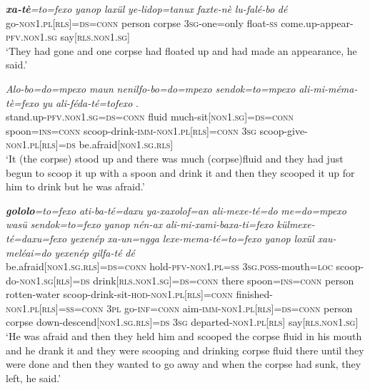 \documentclass[output=paper]{LSP/langsci}
\begin{document}
\begin{exe}
\ex \label{Devex:App4}			
\gll \textit{\textbf{xa-tè}=to=fexo} \textit{yanop} \textit{laxül}	\textit{ye-lidop=tanux} \textit{faxte-nè} \textit{lu-falé-bo} \textit{dé}\\
go-\textsc{non1.pl[rls]=ds=conn}	person corpse \textsc{3sg}-one=only float-\textsc{ss}	come.up-appear-\textsc{pfv.non1.sg} say[\textsc{rls.non1.sg}]\\
\glt `They had gone and one corpse had floated up and had made an appearance, he said.'
\end{exe}			
			
\begin{exe}
\ex \label{Devex:App5}			
\gll \textit{Alo-bo=do=mpexo} \textit{maun} \textit{nenilfo-bo=do=mpexo} \textit{sendok=to=mpexo} \textit{ali-mi-méma-tè=fexo} \textit{yu} \textit{ali-féda-té=tofexo} \underline{\textit{}}.\\
stand.up-\textsc{pfv.non1.sg=ds=conn} fluid much-sit[\textsc{non1.sg}]=\textsc{ds=conn} spoon=\textsc{ins=conn}	scoop-drink-\textsc{imm-non1.pl[rls]=conn} \textsc{3sg} scoop-give-\textsc{non1.pl[rls]=ds} be.afraid[\textsc{non1.sg.rls}]\\
\glt `It (the corpse) stood up and there was much (corpse)fluid and they had just begun to scoop it up with a spoon and drink it and then they scooped it up for him to drink but he was afraid.'\\
\end{exe}			
	
\begin{exe}
\ex \label{Devex:App6}			
\gll \textit{\textbf{gololo}=to=fexo}	\textit{ati-ba-té=daxu}	\textit{ya-xaxolof=an} \textit{ali-mexe-té=do} \textit{me=do=mpexo} \textit{wasü} \textit{sendok=to=fexo} \textit{yanop} \textit{nén-ax} \textit{ali-mi-xami-baxa-ti=fexo} \textit{külmexe-té=daxu=fexo} \textit{yexenép} \textit{xa-un=ngga} \textit{lexe-mema-té=to=fexo} \textit{yanop} \textit{loxül} \textit{xau-meléai=do} \textit{yexenép} \textit{gilfa-té} \textit{dé}\\
be.afraid[\textsc{non1.sg.rls}]=\textsc{ds=conn} hold-\textsc{pfv-non1.pl=ss} \textsc{3sg.poss}-mouth=\textsc{loc} scoop-do-\textsc{non1.sg[rls]=ds} drink[\textsc{rls.non1.sg}]=\textsc{ds=conn} there spoon=\textsc{ins=conn}	person rotten-water scoop-drink-sit-\textsc{hod-non1.pl[rls]=conn} finished-\textsc{non1.pl[rls]=ss=conn} \textsc{3pl}	go-\textsc{inf=conn}	aim-\textsc{imm-non1.pl[rls]=ds=conn} person	corpse down-descend[\textsc{non1.sg.rls}]=\textsc{ds} \textsc{3sg} departed-\textsc{non1.pl[rls]} say[\textsc{rls.non1.sg}]\\
\glt `He was afraid and then they held him and scooped the corpse fluid in his mouth and he drank it and they were scooping  and drinking corpse fluid  there until they were done and then they wanted to go away and when the corpse had sunk, they left, he said.'\\		
\end{exe}						
			
\end{document}
